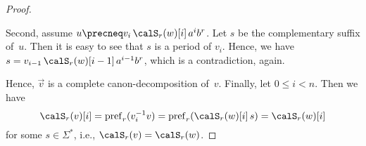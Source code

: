\begin{proof}
	\begin{figure}[h]
		\centering
		\caption{\label{fig:skeleton}}
	\end{figure}
	
	Second, assume $u\precneq v_i\,\calS_r(w)[i]\,a^ib^{r}$. Let $s$ be the complementary suffix of~$u$. Then it is easy to see that $s$ is a period of $v_i$. Hence, we have $s=v_{i-1}\,\calS_r(w)[i-1]\,a^{i-1}b^{r}$, which is a contradiction, again.
	
	Hence, $\vec{v}$ is a complete canon-decomposition of~$v$. Finally, let $0\leq i<n$. Then we have
	\[\calS_r(v)[i]=\pref_r(\inv{v_i}v)=\pref_r(\calS_r(w)[i]\,s)=\calS_r(w)[i]\]
	for some $s\in\varSigma^*$, i.e., $\calS_r(v)=\calS_r(w)$.
\end{proof}